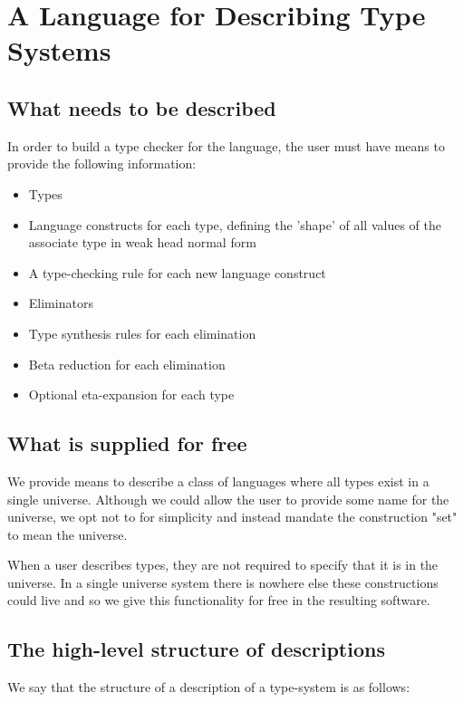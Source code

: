 \chapter{A Language for Describing Type Systems}


\section{What needs to be described}

In order to build a type checker for the language, the user must have
means to provide the following information:

\begin{itemize}
  \item Types
  \item Language constructs for each type, defining the 'shape' of
    all values of the associate type in weak head normal form
  \item A type-checking rule for each new language construct
  \item Eliminators
  \item Type synthesis rules for each elimination
  \item Beta reduction for each elimination
  \item Optional eta-expansion for each type
\end{itemize}

\section{What is supplied for free}

We provide means to describe a class of languages where all types
exist in a single universe. Although we could allow the user to
provide some name for the universe, we opt not to for simplicity and
instead mandate the construction "set" to mean the universe.

When a user describes types, they are not required to specify that it
is in the universe. In a single universe system there is nowhere else
these constructions could live and so we give this functionality for
free in the resulting software.

\section{The high-level structure of descriptions}

We say that the structure of a description of a type-system is as
follows: 

